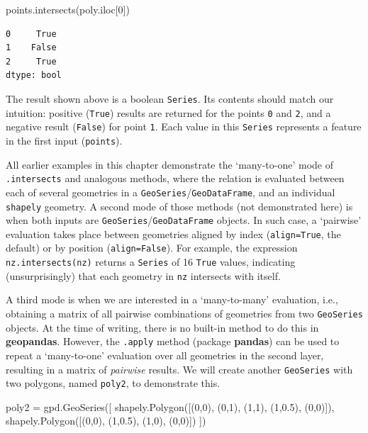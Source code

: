 \documentclass[
  letterpaper,
]{krantz}
\newenvironment{Shaded}{\begin{snugshade}}{\end{snugshade}}
\newcommand{\DecValTok}[1]{\textcolor[rgb]{0.68,0.00,0.00}{#1}}
\newcommand{\FloatTok}[1]{\textcolor[rgb]{0.68,0.00,0.00}{#1}}
\newcommand{\NormalTok}[1]{\textcolor[rgb]{0.00,0.23,0.31}{#1}}
\newcommand{\OperatorTok}[1]{\textcolor[rgb]{0.37,0.37,0.37}{#1}}
\begin{document}
\begin{Shaded}
\begin{Highlighting}[]
\NormalTok{points.intersects(poly.iloc[}\DecValTok{0}\NormalTok{])}
\end{Highlighting}
\end{Shaded}

\begin{verbatim}
0     True
1    False
2     True
dtype: bool
\end{verbatim}

The result shown above is a boolean \texttt{Series}. Its contents should
match our intuition: positive (\texttt{True}) results are returned for
the points \texttt{0} and \texttt{2}, and a negative result
(\texttt{False}) for point \texttt{1}. Each value in this
\texttt{Series} represents a feature in the first input
(\texttt{points}).

All earlier examples in this chapter demonstrate the `many-to-one' mode
of \texttt{.intersects} and analogous methods, where the relation is
evaluated between each of several geometries in a
\texttt{GeoSeries}/\texttt{GeoDataFrame}, and an individual
\texttt{shapely} geometry. A second mode of those methods (not
demonstrated here) is when both inputs are
\texttt{GeoSeries}/\texttt{GeoDataFrame} objects. In such case, a
`pairwise' evaluation takes place between geometries aligned by index
(\texttt{align=True}, the default) or by position
(\texttt{align=False}). For example, the expression
\texttt{nz.intersects(nz)} returns a \texttt{Series} of 16 \texttt{True}
values, indicating (unsurprisingly) that each geometry in \texttt{nz}
intersects with itself.

A third mode is when we are interested in a `many-to-many' evaluation,
i.e., obtaining a matrix of all pairwise combinations of geometries from
two \texttt{GeoSeries} objects. At the time of writing, there is no
built-in method to do this in \textbf{geopandas}. However, the
\texttt{.apply} method (package \textbf{pandas}) can be used to repeat a
`many-to-one' evaluation over all geometries in the second layer,
resulting in a matrix of \emph{pairwise} results. We will create another
\texttt{GeoSeries} with two polygons, named \texttt{poly2}, to
demonstrate this.

\begin{Shaded}
\begin{Highlighting}[]
\NormalTok{poly2 }\OperatorTok{=}\NormalTok{ gpd.GeoSeries([}
\NormalTok{  shapely.Polygon([(}\DecValTok{0}\NormalTok{,}\DecValTok{0}\NormalTok{), (}\DecValTok{0}\NormalTok{,}\DecValTok{1}\NormalTok{), (}\DecValTok{1}\NormalTok{,}\DecValTok{1}\NormalTok{), (}\DecValTok{1}\NormalTok{,}\FloatTok{0.5}\NormalTok{), (}\DecValTok{0}\NormalTok{,}\DecValTok{0}\NormalTok{)]),}
\NormalTok{  shapely.Polygon([(}\DecValTok{0}\NormalTok{,}\DecValTok{0}\NormalTok{), (}\DecValTok{1}\NormalTok{,}\FloatTok{0.5}\NormalTok{), (}\DecValTok{1}\NormalTok{,}\DecValTok{0}\NormalTok{), (}\DecValTok{0}\NormalTok{,}\DecValTok{0}\NormalTok{)])}
\NormalTok{])}
\end{Highlighting}
\end{Shaded}
\end{document}
